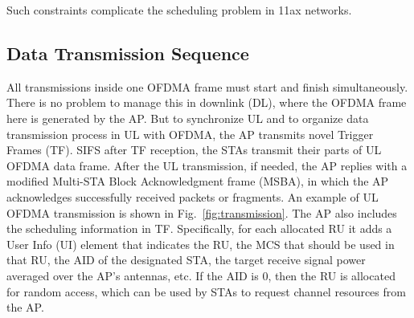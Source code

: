 Such constraints complicate the scheduling problem in 11ax networks.

\subsection{Data Transmission Sequence}

All transmissions inside one OFDMA frame must start and finish simultaneously. 
There is no problem to manage this in downlink (DL), where the OFDMA frame here is generated by the AP. 
But to synchronize UL and to organize data transmission process in UL with OFDMA, the AP transmits novel Trigger Frames (TF).
SIFS after TF reception, the STAs transmit their parts of UL OFDMA data frame. 
After the UL transmission, if needed, the AP replies with a modified Multi-STA
Block Acknowledgment frame (MSBA), in which the AP acknowledges successfully received packets or fragments.
An example of UL OFDMA transmission is shown in Fig.~\ref{fig:transmission}.
The AP also includes the scheduling information in TF.
Specifically, for each allocated RU it adds a User Info (UI) element that indicates the RU, the MCS that should be used in that RU, the AID of the designated STA, the target receive signal power averaged over the AP's antennas, etc. 
If the AID is $0$, then the RU is allocated for random access, which can be used by STAs to request channel resources from the AP.

